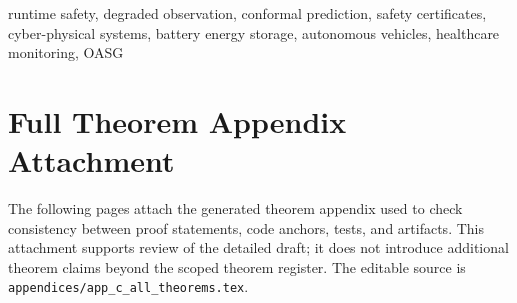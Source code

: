 \documentclass[10pt,journal,twocolumn]{IEEEtran}
\begin{document}
\begin{abstract}
All promoted runtime surfaces maintain 100\% certificate-chain validity, 100\% audit completeness,
and zero contract failures on their active runtime surfaces.  All results are reproducible
from locked artifacts with SHA-256 hashes.  We report a strict theorem core,
the complete shift-aware adaptive uncertainty mechanism, and a three-domain synthesis
showing that the same kernel survives domain change without semantic loss while keeping
battery-specific proof depth clearly distinguished from the bounded AV and Healthcare evidence.
\end{abstract}

\begin{IEEEkeywords}
runtime safety, degraded observation, conformal prediction, safety certificates,
cyber-physical systems, battery energy storage, autonomous vehicles, healthcare monitoring, OASG
\end{IEEEkeywords}















\clearpage
\onecolumn
\appendices


\clearpage
\section{Full Theorem Appendix Attachment}
\label{app:full_theorem_package_attachment}
The following pages attach the generated theorem appendix used to check consistency
between proof statements, code anchors, tests, and artifacts. This attachment supports
review of the detailed draft; it does not introduce additional theorem claims beyond
the scoped theorem register. The editable source is
\texttt{appendices/app\_c\_all\_theorems.tex}.





\end{document}
